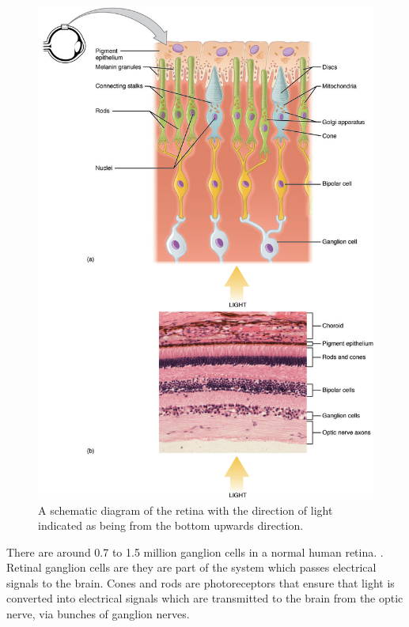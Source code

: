 \begin{figure}[htbp]
  \centering
    \includegraphics{figures/rods_and_cones}
  \caption{A schematic diagram of the retina with the direction of light indicated
  as being from the bottom upwards direction.}
  \label{fig:retina}
\end{figure}

There are around 0.7 to 1.5 million ganglion cells in a normal human retina.
\cite{curcio1990topography}. Retinal ganglion cells are  they are part of
the system which passes electrical signals to the brain.
\cite{meyer1995characterization} Cones and rods are photoreceptors that ensure
that light is converted into electrical signals which are transmitted to the
brain from the optic nerve, via bunches of ganglion nerves.

